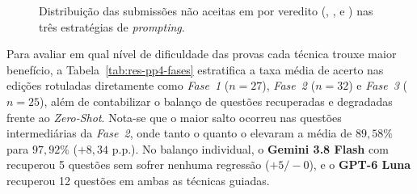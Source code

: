 \begin{figure}[!htbp]
\centering

\caption[Decomposição de erros em C por estratégia na PP4]{Distribuição das submissões não aceitas em  por veredito (, ,  e ) nas três estratégias de \textit{prompting}.}
\label{fig:res-pp4-erros}
\end{figure}
\FloatBarrier

Para avaliar em qual nível de dificuldade das provas cada técnica trouxe maior benefício, a Tabela~\ref{tab:res-pp4-fases} estratifica a taxa média de acerto nas edições rotuladas diretamente como \textit{Fase~1} ($n=27$), \textit{Fase~2} ($n=32$) e \textit{Fase~3} ($n=25$), além de contabilizar o balanço de questões recuperadas e degradadas frente ao \textit{Zero-Shot}. Nota-se que o maior salto ocorreu nas questões intermediárias da \textit{Fase~2}, onde tanto o  quanto o  elevaram a média de $89{,}58\%$ para $97{,}92\%$ ($+8{,}34\text{ p.p.}$). No balanço individual, o \textbf{Gemini 3.8 Flash} com  recuperou 5 questões sem sofrer nenhuma regressão ($+5/-0$), e o \textbf{GPT-6 Luna} recuperou 12 questões em ambas as técnicas guiadas.

\begin{table}[!htbp]
\centering
\caption{Taxa média de aprovação () por fase da OBI Sênior em  e balanço de transições frente ao \textit{Zero-Shot}.}
\label{tab:res-pp4-fases}
\par{}
\end{table}

